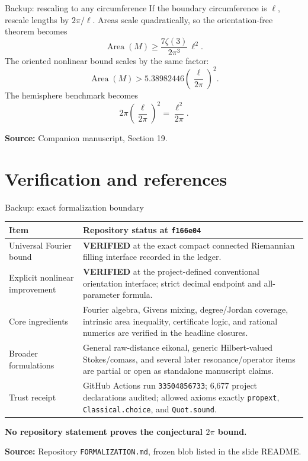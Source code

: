 \documentclass[11pt,aspectratio=169,usepdftitle=false]{beamer}
\newcommand{\Area}{\operatorname{Area}}
\newcommand{\good}{\textcolor{LeafGreen}{\bfseries VERIFIED}}
\newcommand{\sourcefoot}[1]{\par\vfill{\tiny\color{Slate}\textbf{Source:} #1}}
\begin{document}
\begin{frame}{Backup: rescaling to any circumference}\label{bk:scaling}
  If the boundary circumference is $\ell$, rescale lengths by $2\pi/\ell$.
  Areas scale quadratically, so the orientation-free theorem becomes
  \[
    \boxed{\Area(M)\ge
    \frac{7\zeta(3)}{2\pi^3}\,\ell^2.}
  \]
  The oriented nonlinear bound scales by the same factor:
  \[
    \Area(M)>
    5.38982446\left(\frac{\ell}{2\pi}\right)^2.
  \]
  The hemisphere benchmark becomes
  \[
    2\pi\left(\frac{\ell}{2\pi}\right)^2
    =\frac{\ell^2}{2\pi}.
  \]
  \sourcefoot{Companion manuscript, Section 19.}
\end{frame}

\section{Verification and references}
\begin{frame}{Backup: exact formalization boundary}\label{bk:formalization}
  \scriptsize
  \begin{tabular}{@{}p{}p{}@{}}
    \toprule
    Item & Repository status at \texttt{f166e04}\\
    \midrule
    Universal Fourier bound & \good{} at the exact compact connected
    Riemannian filling interface recorded in the ledger.\\
    Explicit nonlinear improvement & \good{} at the project-defined
    conventional orientation interface; strict decimal endpoint and
    all-parameter formula.\\
    Core ingredients & Fourier algebra, Givens mixing, degree/Jordan coverage,
    intrinsic area inequality, certificate logic, and rational numerics are
    verified in the headline closures.\\
    Broader formulations & General raw-distance eikonal, generic
    Hilbert-valued Stokes/comass, and several later resonance/operator items
    are partial or open as standalone manuscript claims.\\
    Trust receipt & GitHub Actions run \texttt{33504856733}; 6,677 project
    declarations audited; allowed axioms exactly \texttt{propext},
    \texttt{Classical.choice}, and \texttt{Quot.sound}.\\
    \bottomrule
  \end{tabular}\par
  \vspace{0.35cm}
  \centering\bfseries\color{AuburnOrange}
  No repository statement proves the conjectural $2\pi$ bound.
  \sourcefoot{Repository \texttt{FORMALIZATION.md}, frozen blob listed in the slide README.}
\end{frame}
\end{document}
